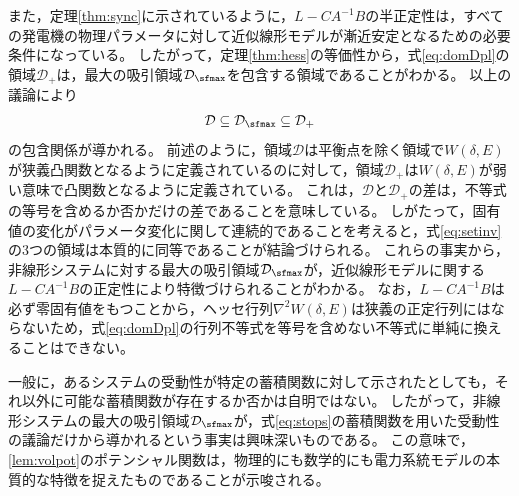 \documentclass[tombow,dvipdfmx]{corona-a5}
\begin{document}
また，定理\ref{thm:sync}に示されているように，$L-CA^{-1}B$の半正定性は，すべての発電機の物理パラメータに対して近似線形モデルが漸近安定となるための必要条件になっている。
したがって，定理\ref{thm:hess}の等価性から，式\ref{eq:domDpl}の領域$\mathcal{D}_{+}$は，最大の吸引領域$\mathcal{D}_{\sfmax}$を包含する領域であることがわかる。
以上の議論により
\begin{align}\label{eq:setinv}
\mathcal{D} \subseteq \mathcal{D}_{\sfmax} \subseteq \mathcal{D}_{+}
\end{align}
の包含関係が導かれる。
前述のように，領域$\mathcal{D}$は平衡点を除く領域で$W(\delta,E)$が狭義凸関数となるように定義されているのに対して，領域$\mathcal{D}_{+}$は$W(\delta,E)$が弱い意味で凸関数となるように定義されている。
これは，$\mathcal{D}$と$\mathcal{D}_{+}$の差は，不等式の等号を含めるか否かだけの差であることを意味している。
しがたって，固有値の変化がパラメータ変化に関して連続的であることを考えると，式\ref{eq:setinv}の3つの領域は本質的に同等であることが結論づけられる。
これらの事実から，非線形システムに対する最大の吸引領域$\mathcal{D}_{\sfmax}$が，近似線形モデルに関する$L-CA^{-1}B$の正定性により特徴づけられることがわかる。
なお，$L-CA^{-1}B$は必ず零固有値をもつことから，ヘッセ行列$\nabla^2 W(\delta,E)$は狭義の正定行列にはならないため，式\ref{eq:domDpl}の行列不等式を等号を含めない不等式に単純に換えることはできない。

一般に，あるシステムの受動性が特定の蓄積関数に対して示されたとしても，それ以外に可能な蓄積関数が存在するか否かは自明ではない。
したがって，非線形システムの最大の吸引領域$\mathcal{D}_{\sfmax}$が，式\ref{eq:stops}の蓄積関数を用いた受動性の議論だけから導かれるという事実は興味深いものである。
この意味で，\ref{lem:volpot}のポテンシャル関数は，物理的にも数学的にも電力系統モデルの本質的な特徴を捉えたものであることが示唆される。





\newpage
\end{document}
